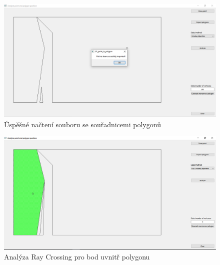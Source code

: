 \documentclass[a4paper,11pt,twoside]{article}
\begin{document}
\vspace{0.2cm}
\begin{figure}[hbt!] 
\begin{center}
\includegraphics[width=15cm]{pictures/success.png} 
\caption[Úspěšné načtení souboru se souřadnicemi polygonů]{Úspěšné načtení souboru se souřadnicemi polygonů}
\label{fig:success}
\end{center}
\end{figure}

\vspace{0.2cm}
\begin{figure}[hbt!] 
\begin{center}
\includegraphics[width=15cm]{pictures/rayinside.png} 
\caption[Analýza Ray Crossing pro bod uvnitř polygonu]{Analýza Ray Crossing pro bod uvnitř polygonu}
\label{fig:rayinside}
\end{center}
\end{figure}
\end{document}
